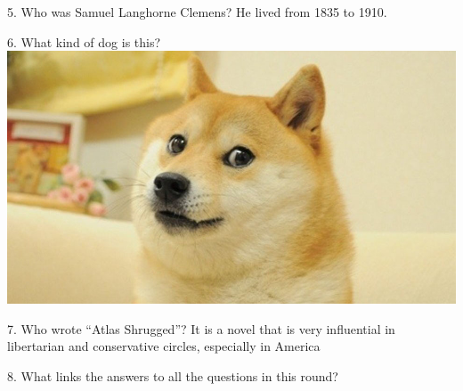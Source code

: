 \begin{frame}
\begin{center}
\Large
5. Who was Samuel Langhorne Clemens? He lived from 1835 to 1910.
\\
\end{center}
\end{frame}
\begin{frame}
\begin{center}
\Large
6. What kind of dog is this?
\\
\vspace{0.5em}\includegraphics[height=0.6\paperheight]{images/doge.jpg}
\\
\end{center}
\end{frame}
\begin{frame}
\begin{center}
\Large
7. Who wrote ``Atlas Shrugged''? It is a novel that is very influential in libertarian and conservative circles, especially in America
\\
\end{center}
\end{frame}
\begin{frame}
\begin{center}
\Large
8. What links the answers to all the questions in this round?
\\
\end{center}
\end{frame}
